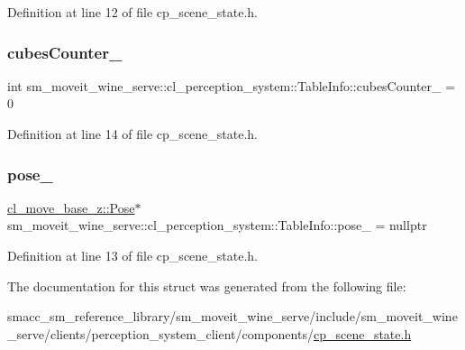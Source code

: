 Definition at line 12 of file cp\+\_\+scene\+\_\+state.\+h.

\mbox{\label{structsm__moveit__wine__serve_1_1cl__perception__system_1_1TableInfo_a315d838f8f9a002f04b5302546d27702}} 
\subsubsection{\texorpdfstring{cubes\+Counter\+\_\+}{cubesCounter\_}}
{\footnotesize\ttfamily int sm\+\_\+moveit\+\_\+wine\+\_\+serve\+::cl\+\_\+perception\+\_\+system\+::\+Table\+Info\+::cubes\+Counter\+\_\+ = 0}



Definition at line 14 of file cp\+\_\+scene\+\_\+state.\+h.

\mbox{\label{structsm__moveit__wine__serve_1_1cl__perception__system_1_1TableInfo_ac3317a85ede986382fb2a88a38006482}} 
\subsubsection{\texorpdfstring{pose\+\_\+}{pose\_}}
{\footnotesize\ttfamily \hyperlink{classcl__move__base__z_1_1Pose}{cl\+\_\+move\+\_\+base\+\_\+z\+::\+Pose}$\ast$ sm\+\_\+moveit\+\_\+wine\+\_\+serve\+::cl\+\_\+perception\+\_\+system\+::\+Table\+Info\+::pose\+\_\+ = nullptr}



Definition at line 13 of file cp\+\_\+scene\+\_\+state.\+h.



The documentation for this struct was generated from the following file\+:\begin{DoxyCompactItemize}
\item 
smacc\+\_\+sm\+\_\+reference\+\_\+library/sm\+\_\+moveit\+\_\+wine\+\_\+serve/include/sm\+\_\+moveit\+\_\+wine\+\_\+serve/clients/perception\+\_\+system\+\_\+client/components/\hyperlink{sm__moveit__wine__serve_2include_2sm__moveit__wine__serve_2clients_2perception__system__client_2components_2cp__scene__state_8h}{cp\+\_\+scene\+\_\+state.\+h}\end{DoxyCompactItemize}
